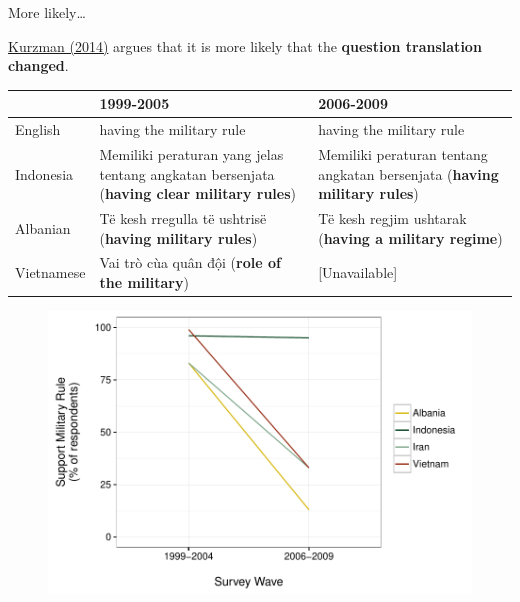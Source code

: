 \documentclass[10pt]{beamer}
\begin{document}
\begin{frame}{More likely\ldots}

    \href{https://www.washingtonpost.com/news/monkey-cage/wp/2014/09/02/world-values-lost-in-translation/}{Kurzman (2014)} argues that it is more likely that the \textbf{question translation changed}.
{\small{
    \begin{table}
        \begin{tabular}{l p{3.5cm} p{3.5cm}}
        \hline
        & 1999-2005 & 2006-2009\\
        \hline\hline
        English & having the military rule & having the military rule \\

        Indonesia & Memiliki peraturan yang jelas tentang angkatan bersenjata (\textbf{having clear military rules}) & Memiliki peraturan tentang angkatan bersenjata (\textbf{having military rules})\\

        Albanian & T\"{e} kesh rregulla t\"{e} ushtris\"{e} (\textbf{having military rules}) & T\"{e} kesh regjim ushtarak (\textbf{having a military regime}) \\

        Vietnamese & Vai tr\`{o} c\`{u}a qu\^{a}n đội (\textbf{role of the military}) & [Unavailable] \\

        \hline
        \end{tabular}
    \end{table}

}}

\end{frame}

\begin{frame}

    \begin{figure}
        \includegraphics[scale=0.5]{img/wvs_compare.pdf}
    \end{figure}

\end{frame}
\end{document}
